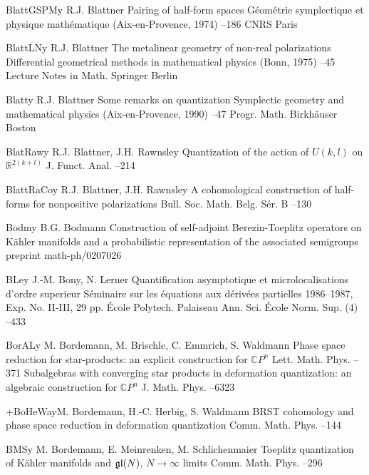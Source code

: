 \documentclass[11pt]{amsart}
\numberwithin{equation}{section}
\theoremstyle{remark}
\newcommand\RR{\mathbb R}
\newcommand{\CC}{\C}
\newcommand{\by}{\mathbf y}
\newcommand{\C}{\mathbb C}
\begin{document}
\begin{thebibliography}{199}
 BlattGSPM\by{ R.J. Blattner \paper Pairing of half-form spaces \inbook
G\'eom\'etrie symplectique et physique math\'ematique (Aix-en-Provence, 1974)
--186 \publ CNRS \publaddr Paris }

 BlattLN\by{ R.J. Blattner \paper The metalinear geometry of non-real
polarizations \inbook Differential geometrical methods in mathematical physics
(Bonn, 1975) --45 \bookinfo Lecture Notes in Math.  \publ
Springer \publaddr Berlin }

 Blatt\by{ R.J. Blattner \paper Some remarks on quantization \inbook
Symplectic geometry and mathematical physics (Aix-en-Provence, 1990) --47 \bookinfo Progr. Math.  \publ Birkh\"auser \publaddr Boston
}

 BlatRaw\by{ R.J. Blattner, J.H. Rawnsley \paper Quantization of the
action of $U(k,l)$ on $\RR^{2(k+l)}$ \jour J. Funct. Anal.  
--214}

 BlattRaCo\by{ R.J. Blattner, J.H. Rawnsley \paper A cohomological
construction of half-forms for nonpositive polarizations \jour Bull. Soc. Math.
Belg. S\'er. B   --130}

 Bodm\by{ B.G. Bodmann \paper Construction of self-adjoint
Berezin-Toeplitz operators on K\"ahler manifolds and a probabilistic
representation of the associated semigroups \paperinfo preprint
math-ph/0207026}

 BLe\by{ J.-M. Bony, N. Lerner \paper Quantification asymptotique et
microlocalisations d'ordre superieur \jour S\'eminaire sur les \'equations aux
d\'eriv\'ees partielles 1986--1987, Exp. No. II-III, 29 pp. \publ \'Ecole
Polytech. \publaddr Palaiseau  \moreref \jour Ann. Sci. \'Ecole Norm.
Sup. (4)   --433}

 BorAL\by{ M. Bordemann, M. Brischle, C. Emmrich, S. Waldmann \paper
Phase space reduction for star-products: an explicit construction for $\CC P^n$
\jour Lett. Math. Phys.   --371 \moreref \paper
Subalgebras with converging star products in deformation quantization: an
algebraic construction for $\CC P^n$ \jour J. Math. Phys.  
--6323}

 +BoHeWa\by{M. Bordemann, H.-C. Herbig, S. Waldmann \paper BRST cohomology
and phase space reduction in deformation quantization \jour Comm. Math. Phys.
  --144}

 BMS\by{ M. Bordemann, E. Meinrenken, M. Schlichenmaier \paper Toeplitz
quantization of K\"ahler manifolds and $\frak g\frak l (N)$, $N\to\infty$
limits \jour Comm. Math. Phys.   --296}


\end{thebibliography}
\end{document}
